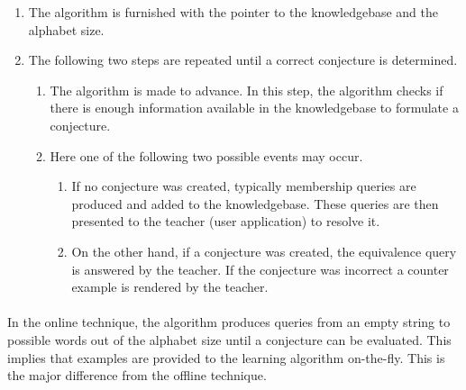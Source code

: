 \begin{enumerate}
 \item The algorithm is furnished with the pointer to the knowledgebase and the alphabet size.
 \item The following two steps are repeated until a correct conjecture is determined.
	\begin{enumerate}
	    \item The algorithm is made to advance. In this step, the algorithm checks if there is enough information available in the knowledgebase to formulate a conjecture.
	    \item Here one of the following two possible events may occur.
	    \begin{enumerate}
	    \item If no conjecture was created, typically membership queries are produced and added to the knowledgebase. These queries are then presented to the teacher (user application) to resolve it.
	    \item On the other hand, if a conjecture was created, the equivalence query is answered by the teacher. If the conjecture was incorrect a counter example is rendered by the teacher.
	    \end{enumerate}
	\end{enumerate}
\end{enumerate}
\paragraph{}
In the online technique, the algorithm produces queries from an empty string to possible words out of the alphabet size until a conjecture can be evaluated. This implies that examples are provided to the learning algorithm on-the-fly. This is the major difference  from the offline technique.

